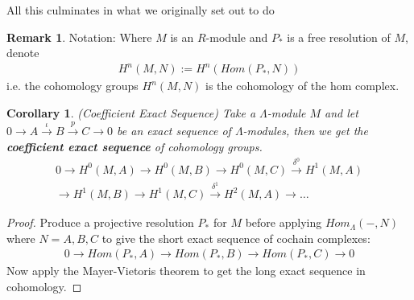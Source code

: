 \documentclass[12pt]{book}
\newtheorem{corollary}[theorem]{Corollary}
\theoremstyle{definition}
\newtheorem{remark}[theorem]{Remark}
\begin{document}
\noindent All this culminates in what we originally set out to do

\begin{remark}
    Notation: Where $M$ is an $R$-module and $P_*$ is a free resolution of $M$, denote 
    \begin{align*}
        H^n(M, N) := H^n(Hom(P_*, N))
    \end{align*}
    i.e. the cohomology groups $H^n(M,N)$ is the cohomology of the hom complex. 
\end{remark}

\begin{corollary}(Coefficient Exact Sequence)
    Take a $\Lambda$-module $M$ and let $0 \rightarrow A \xrightarrow{\iota} B \xrightarrow{p} C \rightarrow 0$ be an exact sequence of $\Lambda$-modules, then we get the \textbf{coefficient exact sequence} of cohomology groups.
    \begin{align*}
        0 \rightarrow H^0(M, A) \rightarrow H^0(M, B) \rightarrow H^0(M, C) \xrightarrow{\delta^0} H^1(M, A)\\
        \rightarrow H^1(M, B) \rightarrow H^1(M,C) \xrightarrow{\delta^1} H^2(M, A) \rightarrow \dots 
    \end{align*}
\end{corollary}

\begin{proof}
    Produce a projective resolution $P_*$ for $M$ before applying $Hom_\Lambda(-, N)$ where $ N = A,B,C$ to give the short exact sequence of cochain complexes: 
    \begin{align*}
        0 \rightarrow Hom(P_*, A) \rightarrow Hom(P_*, B) \rightarrow Hom(P_*, C) \rightarrow 0
    \end{align*}
    Now apply the Mayer-Vietoris theorem to get the long exact sequence in cohomology.
\end{proof}
\end{document}
